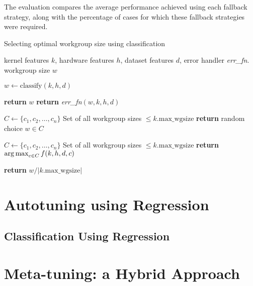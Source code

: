 The evaluation compares the average performance achieved using each
fallback strategy, along with the percentage of cases for which these
fallback strategies were required.

\begin{algorithm}
\caption{Selecting optimal workgroup size using classification}\label{bar}
\begin{algorithmic}[1]
\Require kernel features $k$, hardware features $h$, dataset features
$d$, error handler \textit{err\_fn}.
\Ensure workgroup size $w$

\State $w \leftarrow \text{classify}(k, h, d)$

    \State \textbf{return} $w$
\Else
    \State \textbf{return} \textit{err\_fn}$(w, k, h, d)$
\EndIf
\item[]

  \State $C \leftarrow \{c_1, c_2, \ldots, c_n \}$
  \Comment Set of all workgroup sizes $\le k.\text{max\_wgsize}$
  \State \textbf{return} random choice $w \in C$
\EndProcedure
\item[]

  \State $C \leftarrow \{c_1, c_2, \ldots, c_n \}$
  \Comment Set of all workgroup sizes $\le k.\text{max\_wgsize}$
  \State \textbf{return} $\operatorname*{arg\,max}_{c \in C}f(k,h,d,c)$
\EndProcedure
\item[]

  \State \textbf{return} $w / |k.\text{max\_wgsize}|$
\EndProcedure
\end{algorithmic}
\end{algorithm}


\section{Autotuning using Regression}


\subsection{Classification Using Regression}


\section{Meta-tuning: a Hybrid Approach}

